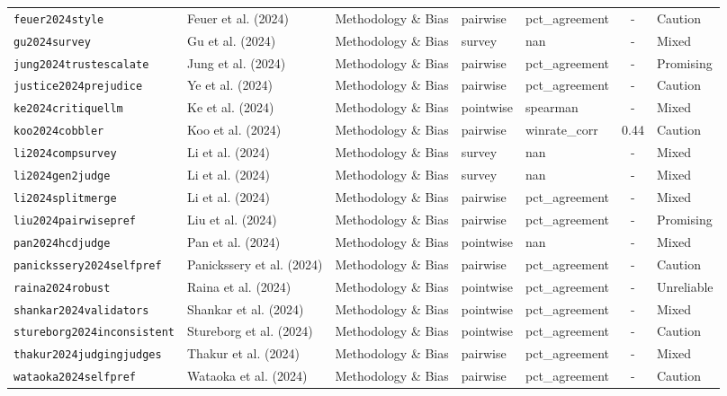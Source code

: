 \begin{longtable}{@{}l l l l l c l@{}}
\texttt{feuer2024style} & Feuer et al. (2024) & Methodology \& Bias & pairwise & pct\_agreement & - & Caution \\
\texttt{gu2024survey} & Gu et al. (2024) & Methodology \& Bias & survey & nan & - & Mixed \\
\texttt{jung2024trustescalate} & Jung et al. (2024) & Methodology \& Bias & pairwise & pct\_agreement & - & Promising \\
\texttt{justice2024prejudice} & Ye et al. (2024) & Methodology \& Bias & pairwise & pct\_agreement & - & Caution \\
\texttt{ke2024critiquellm} & Ke et al. (2024) & Methodology \& Bias & pointwise & spearman & - & Mixed \\
\texttt{koo2024cobbler} & Koo et al. (2024) & Methodology \& Bias & pairwise & winrate\_corr & 0.44 & Caution \\
\texttt{li2024compsurvey} & Li et al. (2024) & Methodology \& Bias & survey & nan & - & Mixed \\
\texttt{li2024gen2judge} & Li et al. (2024) & Methodology \& Bias & survey & nan & - & Mixed \\
\texttt{li2024splitmerge} & Li et al. (2024) & Methodology \& Bias & pairwise & pct\_agreement & - & Mixed \\
\texttt{liu2024pairwisepref} & Liu et al. (2024) & Methodology \& Bias & pairwise & pct\_agreement & - & Promising \\
\texttt{pan2024hcdjudge} & Pan et al. (2024) & Methodology \& Bias & pointwise & nan & - & Mixed \\
\texttt{panickssery2024selfpref} & Panickssery et al. (2024) & Methodology \& Bias & pairwise & pct\_agreement & - & Caution \\
\texttt{raina2024robust} & Raina et al. (2024) & Methodology \& Bias & pointwise & pct\_agreement & - & Unreliable \\
\texttt{shankar2024validators} & Shankar et al. (2024) & Methodology \& Bias & pointwise & pct\_agreement & - & Mixed \\
\texttt{stureborg2024inconsistent} & Stureborg et al. (2024) & Methodology \& Bias & pointwise & pct\_agreement & - & Caution \\
\texttt{thakur2024judgingjudges} & Thakur et al. (2024) & Methodology \& Bias & pairwise & pct\_agreement & - & Mixed \\
\texttt{wataoka2024selfpref} & Wataoka et al. (2024) & Methodology \& Bias & pairwise & pct\_agreement & - & Caution \\

\end{longtable}
